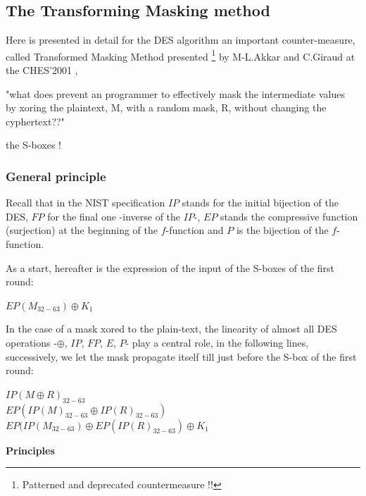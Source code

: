 \newpage
\subsection{The Transforming Masking method}
\label{The_Transforming_Masking_Method}


Here is presented in detail for the DES algorithm an important counter-measure, 
called Transformed Masking Method presented 
\footnote{Patterned and deprecated countermeasure !!}
by M-L.Akkar and C.Giraud at the CHES'2001 \nocite{ches-2001}
\cite{phd-Giraud-2007}, 




\begin{center}
"what does prevent an programmer to effectively mask the intermediate values\\ 
by xoring the plaintext, M, with a random mask, R, without changing the cyphertext??"

the S-boxes !
\end{center}

\subsubsection{General principle}
Recall that in the NIST specification $IP$ stands for the initial 
bijection of the DES, $FP$ for the final one -inverse of the $IP$-,
$EP$ stands the compressive function (surjection) at the beginning
of the $f$-function and $P$ is the bijection of the $f$-function.

As a start, hereafter is the expression of the input of the S-boxes of the first round:
\begin{center}
$EP(M_{32-63}) \oplus K_1$
\end{center}

In the case of a mask xored to the plain-text, the linearity of almost all DES 
operations -$\oplus$, $IP$, $FP$, $E$, $P$- play a central role, in the following lines,
successively, we let the mask propagate itself till just before the S-box of 
the first round:
\begin{center}
$IP(M \oplus R)_{32-63} $\\
$EP(IP(M)_{32-63} \oplus IP(R)_{32-63}) $\\
$EP(IP(M_{32-63}) \oplus EP(IP(R)_{32-63}) \oplus K_1$
\end{center}

\textbf{Principles}

